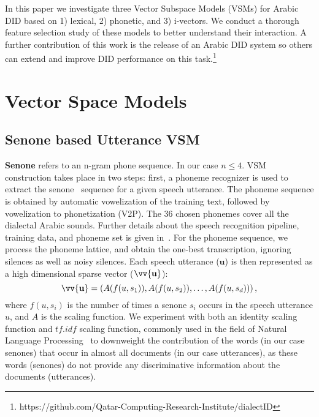 \documentclass{article}
\begin{document}
In this paper we investigate three Vector Subspace Models (VSMs) for Arabic DID based on 1) lexical, 2) phonetic, and 3) i-vectors.  We conduct a thorough feature selection study of these models to better understand their interaction.  A further contribution of this work is the release of an Arabic DID system so others can extend and improve DID performance on this task.\footnote{https://github.com/Qatar-Computing-Research-Institute/dialectID}
 
\section{Vector Space Models}
\label{sec:dialectfeatures}
\subsection{Senone based Utterance VSM}
\label{sec:svsm}
\textbf{Senone} refers to an n-gram phone sequence. In our case $n \le 4$.
VSM construction takes place in two steps:
first, a phoneme recognizer is used to extract the senone~\cite{Hwang} sequence for a given speech utterance. The phoneme sequence is obtained by automatic vowelization of the training text, followed by vowelization to phonetization (V2P). The 36 chosen phonemes cover all the dialectal Arabic sounds. Further details about the speech recognition pipeline, training data, and phoneme set is given in~\cite{ali2014complete}. For the phoneme sequence, we process the phoneme lattice, and obtain the one-best transcription, ignoring silences as well as noisy silences.
Each speech utterance ($\mathbf{u}$) is then represented as a high dimensional sparse vector ($\mathbf{\vv{u}}$):\begin{equation}
      \mathbf{\vv{u}} = \left(A(f(u,s_{1})), A(f(u,s_2)), \ldots, A(f(u,s_d))\right), \label{sv}
    \end{equation}
where $f(u,s_{i})$ is the number of times a senone $s_{i}$ occurs in the speech utterance $u$, and  $A$ is the scaling function. We experiment with both an identity scaling function and $tf.idf$ scaling function, commonly used in the field of Natural Language Processing~\cite{Ramos} to downweight the contribution of the words (in our case senones) that occur in almost all documents (in our case utterances), as these words (senones) do not provide any discriminative information about the documents (utterances).  
\end{document}
